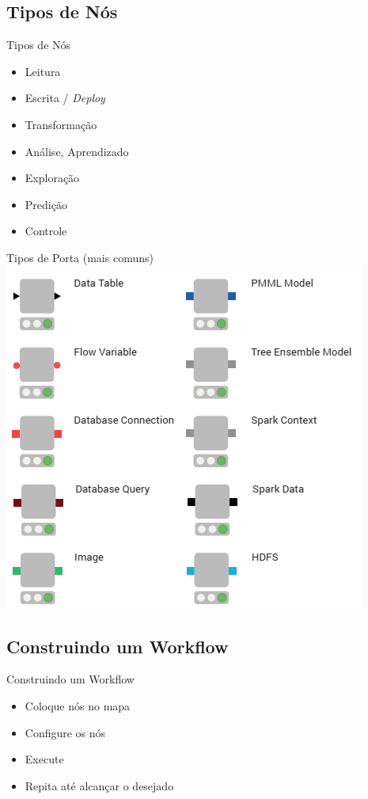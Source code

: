 \documentclass{beamer}
\begin{document}
\subsection{Tipos de Nós}
\begin{frame}{Tipos de Nós}
    \begin{itemize}
        \item Leitura
        \item Escrita / \textit{Deploy}
        \item Transformação
        \item Análise, Aprendizado
        \item Exploração
        \item Predição
        \item Controle
    \end{itemize}
\end{frame} 

\begin{frame}{Tipos de Porta (mais comuns)}
    \centering
\includegraphics[width=0.8\textheight]{Images/tiposdeportas.png}    
\end{frame} 

\subsection{Construindo um Workflow}

\begin{frame}{Construindo um Workflow}
    \begin{itemize}
        \item Coloque nós no mapa
        \item Configure os nós 
        \item Execute
        \item Repita até alcançar o desejado
    \end{itemize}
\end{frame}
\end{document}
